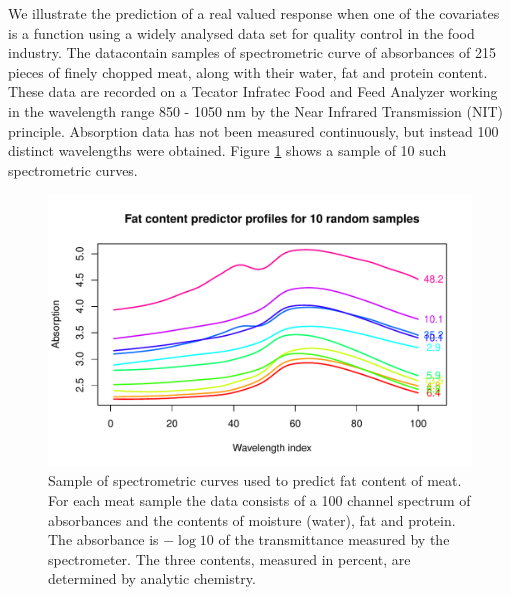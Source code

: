 %



We illustrate the prediction of a real valued response when one of the covariates is a function using a widely analysed data set for quality control in the food industry. The data\footnotemark contain samples of spectrometric curve of absorbances of 215 pieces of finely chopped meat, along with their water, fat and protein content. These data are recorded on a Tecator Infratec Food and Feed Analyzer working in the wavelength range 850 - 1050 nm by the Near Infrared Transmission (NIT) principle. Absorption data has not been measured continuously, but instead 100 distinct wavelengths were obtained. Figure \ref{fig:dataset3} shows a sample of 10 such spectrometric curves.


\begin{knitrout}
\color{fgcolor}\begin{figure}[H]

{\centering \includegraphics[width=12.2cm]{figure/dataset3-1} 

}

\caption[Sample of spectrometric curves used to predict fat content of meat]{Sample of spectrometric curves used to predict fat content of meat. For each meat sample the data consists of a 100 channel spectrum of absorbances and the contents of moisture (water), fat and protein. The absorbance is $- \log 10$ of the transmittance measured by the spectrometer. The three contents, measured in percent, are determined by analytic chemistry.}\label{fig:dataset3}
\end{figure}


\end{knitrout}


